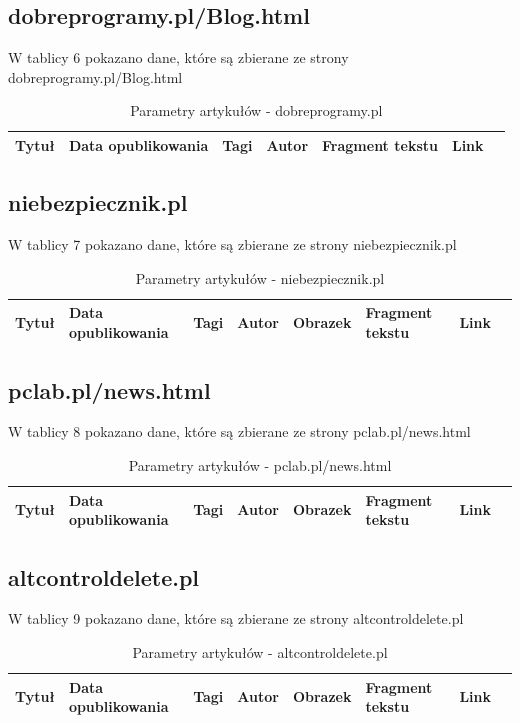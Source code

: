 \documentclass[12pt, titlepage]{article}
\begin{document}
		\subsection{dobreprogramy.pl/Blog.html} 
		W tablicy 6 pokazano dane, które są zbierane ze strony dobreprogramy.pl/Blog.html
		\begin{table}[H]
			\centering
			\caption{Parametry artykułów - dobreprogramy.pl}
			\label{dobreprogramy_parametry}
			\begin{tabular}{ | C{2cm} | C{4cm} | C{2cm} | C{2cm} | C{3cm} | C{2cm} | @{}m{0pt}@{}}
				\hline
				Tytuł & Data opublikowania & Tagi & Autor & Fragment tekstu & Link &\\[0.5cm]
				\hline
			\end{tabular}
		\end{table}
		\subsection{niebezpiecznik.pl}
		W tablicy 7 pokazano dane, które są zbierane ze strony niebezpiecznik.pl
		\begin{table}[H]
			\centering
			\caption{Parametry artykułów - niebezpiecznik.pl}
			\label{niebezpiecznik_parametry}
			\begin{tabular}{ | C{1.5cm} | C{4cm} | C{1.5cm} | C{1.5cm} | C{1.5cm} | C{3cm} | C{1.5cm} | @{}m{0pt}@{}}
				\hline
				Tytuł & Data opublikowania & Tagi & Autor & Obrazek & Fragment tekstu & Link &\\[0.5cm]
				\hline
			\end{tabular}
		\end{table}
		\subsection{pclab.pl/news.html} 
		W tablicy 8 pokazano dane, które są zbierane ze strony pclab.pl/news.html
		\begin{table}[H]
			\centering
			\caption{Parametry artykułów - pclab.pl/news.html}
			\label{z3s_parametry}
			\begin{tabular}{ | C{1.5cm} | C{4cm} | C{1.5cm} | C{1.5cm} | C{1.5cm} | C{3cm} | C{1.5cm} | @{}m{0pt}@{}}
				\hline
				Tytuł & Data opublikowania & Tagi & Autor & Obrazek & Fragment tekstu & Link &\\[0.5cm]
				\hline
			\end{tabular}
		\end{table}
		\subsection{altcontroldelete.pl} 
		W tablicy 9 pokazano dane, które są zbierane ze strony altcontroldelete.pl
		\begin{table}[H]
			\centering
			\caption{Parametry artykułów - altcontroldelete.pl}
			\label{wykop_parametry}
			\begin{tabular}{ | C{1.5cm} | C{4cm} | C{1.5cm} | C{1.5cm} | C{1.5cm} | C{3cm} | C{1.5cm} | @{}m{0pt}@{}}
				\hline
				Tytuł & Data opublikowania & Tagi & Autor & Obrazek & Fragment tekstu & Link &\\[0.5cm]
				\hline
			\end{tabular}
		\end{table}
	
\end{document}

